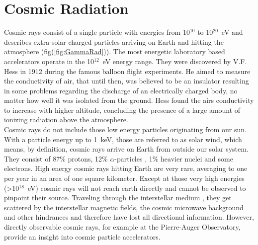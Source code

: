 \documentclass[12pt,article,type=msc,colorback,accentcolor=tud9c]{tudthesis}
\newcommand\blankpage{%
    \null
    \thispagestyle{empty}%
    \addtocounter{page}{-1}%
    \newpage}
\begin{document}
\begin{abstract}





\end{abstract}
\afterpage{\blankpage}

\clearpage
\listoffigures

\clearpage
\tableofcontents


\clearpage
\section{\Large Cosmic Radiation}

%
\begin{figure}[!b] %
\begin{centering}
}
\caption[Cosmic radiation]{Gamma radiation photons (yellow) and scattered cosmic ray protons (blue) from an astrophysical source arriving on Earth. Neutrinos (grey) mostly do not interact. Picture from \cite{ungCTA}}
\label{fig:GammaRad}
\end{centering}
\end{figure}
\noindent
Cosmic rays consist of a single particle with energies from 10$^{10}$ to 10$^{20}$~eV and describes extra-solar charged particles arriving on Earth and hitting the atmosphere (fig(\ref{fig:GammaRad})). The most energetic laboratory based accelerators operate in the 10$^{12}$~eV energy range. They were discovered by V.F. Hess in 1912 during the famous balloon flight experiments. He aimed to measure the conductivity of air, that until then, was believed to be an insulator resulting in some problems regarding the discharge of an electrically charged body, no matter how well it was isolated from the ground. Hess found the airs conductivity to increase with higher altitude, concluding the presence of a large amount of ionizing radiation above the atmosphere. \\
\noindent
Cosmic rays do not include those low energy particles originating from our sun. With a particle energy up to 1~keV, those are referred to as solar wind, which means, by definition, cosmic rays arrive on Earth from outside our solar system. They consist of 87$\%$ protons, 12$\%$ $\alpha$-particles , 1$\%$ heavier nuclei and some electrons. High energy cosmic rays hitting Earth are very rare, averaging to one per year in an area of one square kilometer. Except at those very high energies (>10$^{18}$~eV) cosmic rays will not reach earth directly and cannot be observed to pinpoint their source. Traveling through the interstellar medium , they get scattered by the interstellar magnetic fields, the cosmic microwave background and other hindrances and therefore have lost all directional information. However, directly observable cosmic rays, for example at the Pierre-Auger Observatory, provide an insight into cosmic particle accelerators.\cite{CTADesign}\\
\end{document}
